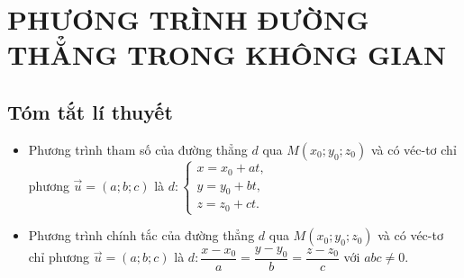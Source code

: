\section{PHƯƠNG TRÌNH ĐƯỜNG THẲNG TRONG KHÔNG GIAN}
\subsection{Tóm tắt lí thuyết}
\begin{itemize}
	\item
Phương trình tham số của đường thẳng $d$ qua $M(x_0;y_0;z_0)$ và có véc-tơ chỉ phương $\vec{u}=(a;b;c)$ là $ d: \begin{cases}
x=x_0+at,\\
y=y_0+bt,\\
z=z_0+ct.
\end{cases}$
\item 
Phương trình chính tắc của đường thẳng $d$ qua $M(x_0;y_0;z_0)$ và có véc-tơ chỉ phương $\vec{u}=(a;b;c)$ là $d: \dfrac{x-x_0}{a}=\dfrac{y-y_0}{b}=\dfrac{z-z_0}{c}$ với $abc\ne 0$.
\end{itemize}

